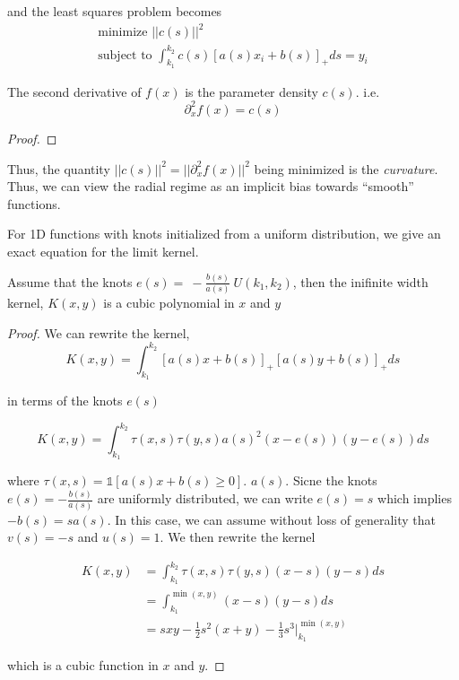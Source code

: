 and the least squares problem becomes
\begin{equation}
    \begin{gathered}
    \text{minimize } ||c(s)||^2\\
    \text{subject to } \int_{k_1}^{k_2} c(s) [a(s)x_i + b(s)]_+ ds = y_i
    \end{gathered}
\end{equation}

\begin{lemma}\label{le:curvature}
The second derivative of $f(x)$ is the parameter density $c(s)$. i.e. 
\begin{equation*}\partial_x^2 f(x) = c(s)\end{equation*}
\end{lemma}
\begin{proof}
\end{proof}

Thus, the quantity $||c(s)||^2 = ||\partial_x^2 f(x)||^2$ being minimized is the \emph{curvature}. Thus, we can view the radial regime as an implicit bias towards ``smooth'' functions.



For 1D functions with knots initialized from a uniform distribution, we give an exact equation for the limit kernel. 

\begin{lemma}\label{le:cubic_spline}
Assume that the knots $e(s) =\ -\frac{b(s)}{a(s)} ~ U(k_1, k_2)$, then the inifinite width kernel, $K(x, y)$ is a cubic polynomial in $x$ and $y$
\end{lemma}
\begin{proof}

We can rewrite the kernel,
\begin{equation}
    K(x, y) = \int_{k_1}^{k_2} [a(s)x + b(s)]_+ [a(s)y + b(s)]_+ ds
\end{equation}

in terms of the knots $e(s)$

\begin{equation}
    K(x, y) = \int_{k_1}^{k_2} \tau(x, s) \tau(y, s) a(s)^2 (x - e(s)) (y - e(s)) ds
\end{equation}

where $\tau(x, s) = \mathds{1}[a(s)x + b(s) \geq 0]$. $a(s)$. Sicne the knots $e(s) = -\frac{b(s)}{a(s)}$ are uniformly distributed, we can write $e(s) = s$ which implies $-b(s) = s a(s)$. In this case, we can assume without loss of generality that $v(s) = -s$ and $u(s) = 1$. We then rewrite the kernel

\begin{equation}
    \begin{aligned}
    K(x, y) &= \int_{k_1}^{k_2} \tau(x, s) \tau(y, s) (x - s) (y - s) ds\\
            &= \int_{k_1}^{\min(x, y)} (x - s) (y - s) ds\\ 
            &= s xy - \frac{1}{2} s^2 (x + y) - \frac{1}{3} s^3 \bigg\rvert_{k_1}^{\min(x, y)}
    \end{aligned}
\end{equation}

which is a cubic function in $x$ and $y$.
\end{proof}

